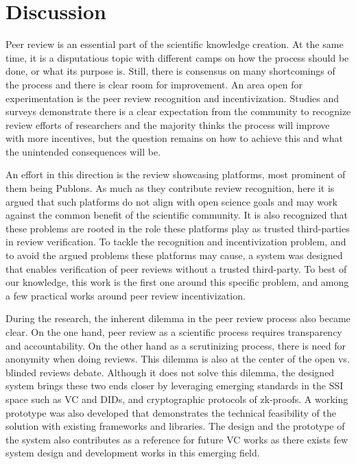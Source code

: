 
\chapter{Discussion}\label{chapter:discussion}

Peer review is an essential part of the scientific knowledge creation. At the same time, it is a disputatious topic with different camps on how the process should be done, or what its purpose is. Still, there is consensus on many shortcomings of the process and there is clear room for improvement. An area open for experimentation is the peer review recognition and incentivization. Studies and surveys demonstrate there is a clear expectation from the community to recognize review efforts of researchers and the majority thinks the process will improve with more incentives, but the question remains on how to achieve this and what the unintended consequences will be. 

An effort in this direction is the review showcasing platforms, most prominent of them being Publons. As much as they contribute review recognition, here it is argued that such platforms do not align with open science goals and may work against the common benefit of the scientific community. It is also recognized that these problems are rooted in the role these platforms play as trusted third-parties in review verification. To tackle the recognition and incentivization problem, and to avoid the argued problems these platforms may cause, a system was designed that enables verification of peer reviews without a trusted third-party. To best of our knowledge, this work is the first one around this specific problem, and among a few practical works around peer review incentivization.

During the research, the inherent dilemma in the peer review process also became clear. On the one hand, peer review as a scientific process requires transparency and accountability. On the other hand as a scrutinizing process, there is need for anonymity when doing reviews. This dilemma is also at the center of the open vs. blinded reviews debate. Although it does not solve this dilemma, the designed system brings these two ends closer by leveraging emerging standards in the \acrlong{SSI} space such as \acrlong{VC} and \acrlong{DID}s, and cryptographic protocols of \acrlong{zk-proofs}. A working prototype was also developed that demonstrates the technical feasibility of the solution with existing frameworks and libraries. The design and the prototype of the system also contributes as a reference for future \acrlong{VC} works as there exists few system design and development works in this emerging field. 

